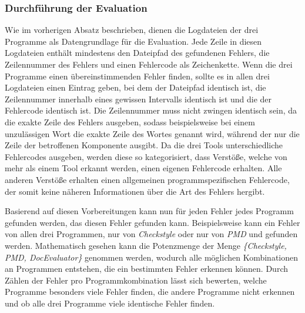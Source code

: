 \subsubsection{Durchführung der Evaluation}
Wie im vorherigen Absatz beschrieben, dienen die Logdateien der drei Programme als Datengrundlage für die Evaluation. Jede Zeile in diesen Logdateien enthält mindestens den Dateipfad des gefundenen Fehlers, die Zeilennummer des Fehlers und einen Fehlercode als Zeichenkette.  Wenn die drei Programme einen übereinstimmenden Fehler finden, sollte es in allen drei Logdateien einen Eintrag geben, bei dem der Dateipfad identisch ist, die Zeilennummer innerhalb eines gewissen Intervalls identisch ist und die der Fehlercode identisch ist. Die Zeilennummer muss nicht zwingen identisch sein, da  \checkpmd die exakte Zeile des Fehlers ausgeben, sodass beispielsweise bei einem unzulässigen Wort die exakte Zeile des Wortes genannt wird, während der \doceval nur die Zeile der betroffenen Komponente ausgibt. Da die drei Tools unterschiedliche Fehlercodes ausgeben, werden diese so kategorisiert, dass Verstöße, welche von mehr als einem Tool erkannt werden, einen eigenen Fehlercode erhalten. Alle anderen Verstöße erhalten einen allgemeinen programmspezifischen Fehlercode, der somit keine näheren Informationen über die Art des Fehlers hergibt.

Basierend auf diesen Vorbereitungen kann nun für jeden Fehler jedes Programm gefunden werden, das diesen Fehler gefunden kann. Beispielsweise kann ein Fehler von allen drei Programmen, nur von \textit{Checkstyle} oder nur von \textit{PMD} und \doceval gefunden werden. Mathematisch gesehen kann die Potenzmenge der Menge \textit{\{Checkstyle, PMD, DocEvaluator\}} genommen werden, wodurch alle möglichen Kombinationen an Programmen entstehen, die ein bestimmten Fehler erkennen können. Durch Zählen der Fehler pro Programmkombination lässt sich bewerten, welche Programme besonders viele Fehler finden, die andere Programme nicht erkennen und ob alle drei Programme viele identische Fehler finden. 


